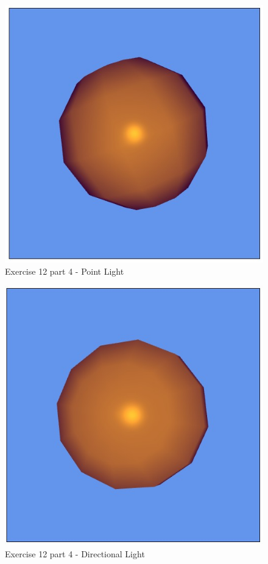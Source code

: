 \begin{figure}[ht!]
	\begin{center}
		\includegraphics[width=.5\textwidth]{figures/exercise_12_part_4_1}
	\end{center}
	\vspace{-4.5ex}\caption{Exercise 12 part 4 - Point Light}
	\label{fig:exercise_12_part_4_1} 
\end{figure}

\begin{figure}[ht!]
	\begin{center}
		\includegraphics[width=.5\textwidth]{figures/exercise_12_part_4_2}
	\end{center}
	\vspace{-4.5ex}\caption{Exercise 12 part 4 - Directional Light}
	\label{fig:exercise_12_part_4_2} 
\end{figure}
\clearpage
